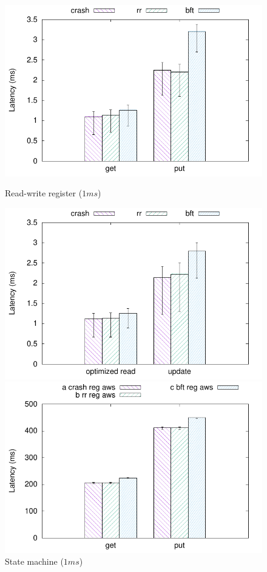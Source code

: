 \begin{figure}[th!]
    \centering
    \begin{minipage}[t]{0.24\linewidth}
        \includegraphics[width=\linewidth]{teem_results/protocol/1ms/lat/1ms_reg}
        \caption{Read-write register ($1ms$)}\label{fig:1ms_reg_lat}
    \end{minipage}
    \begin{minipage}[t]{0.24\linewidth}
        \includegraphics[width=\linewidth]{teem_results/protocol/1ms/lat/1ms_smr}
        \caption{State machine ($1ms$)}\label{fig:1ms_smr_lat}
    \end{minipage}
    \begin{minipage}[t]{0.24\linewidth}
        \includegraphics[width=\linewidth]{teem_results/protocol/aws/aws_reg}

\end{minipage}
\end{figure}

